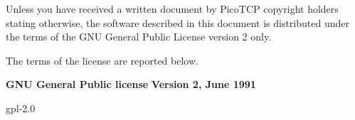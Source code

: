 Unless you have received a written document by PicoTCP copyright holders stating otherwise,
the software described in this document is distributed under the terms of the GNU General 
Public License version 2 only.

The terms of the license are reported below.

\begin{center}
{\bf\large GNU General Public license}
{\bf Version 2, June 1991}
\end{center}
 {gpl-2.0}
